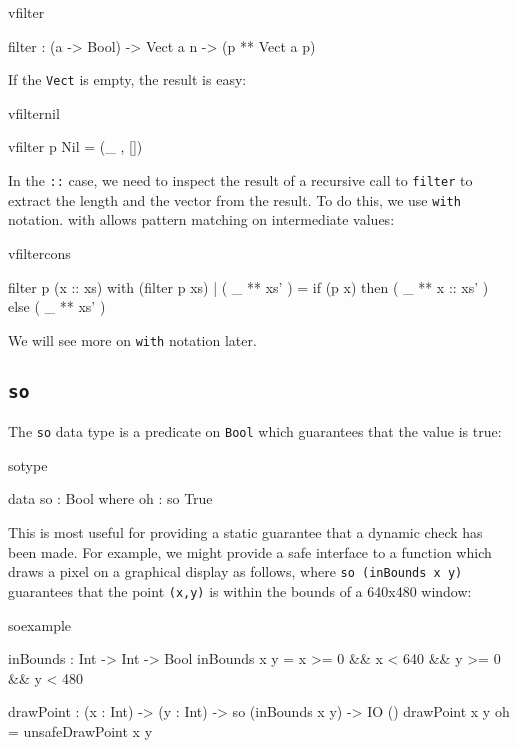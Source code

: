 \begin{SaveVerbatim}{vfilter}

filter : (a -> Bool) -> Vect a n -> (p ** Vect a p)

\end{SaveVerbatim}

\noindent
If the \texttt{Vect} is empty, the result is easy:

\begin{SaveVerbatim}{vfilternil}

vfilter p Nil = (_ , [])

\end{SaveVerbatim}

\noindent
In the \texttt{::} case, we need to inspect the result of a recursive call to 
\texttt{filter} to
extract the length and the vector from the result. To do this, we use \texttt{with}
notation. with allows pattern matching on intermediate values:

\begin{SaveVerbatim}{vfiltercons}

filter p (x :: xs) with (filter p xs)
  | ( _ ** xs' ) = if (p x) then ( _ ** x :: xs' ) else ( _ ** xs' )

\end{SaveVerbatim}

\noindent
We will see more on \texttt{with} notation later.

\subsection{\texttt{so}}

The \texttt{so} data type is a predicate on \texttt{Bool} which guarantees that the
value is true:

\begin{SaveVerbatim}{sotype}

data so : Bool where
    oh : so True

\end{SaveVerbatim}

\noindent
This is most useful for providing a static guarantee that a dynamic check has been made.
For example, we might provide a safe interface to a function which draws a pixel
on a graphical display as follows, where \texttt{so (inBounds x y)} guarantees that 
the point \texttt{(x,y)} is within the bounds of a 640x480 window:

\begin{SaveVerbatim}{soexample}

inBounds : Int -> Int -> Bool
inBounds x y = x >= 0 && x < 640 && y >= 0 && y < 480

drawPoint : (x : Int) -> (y : Int) -> so (inBounds x y) -> IO ()
drawPoint x y oh = unsafeDrawPoint x y

\end{SaveVerbatim}

